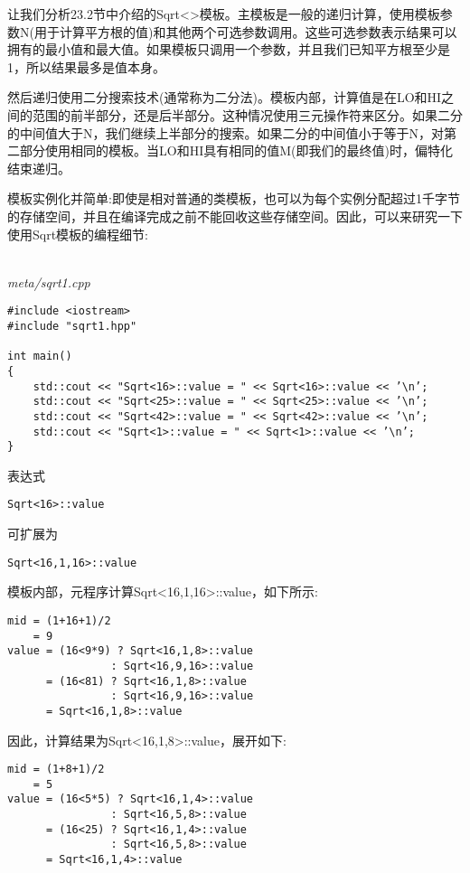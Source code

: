 
让我们分析23.2节中介绍的Sqrt<>模板。主模板是一般的递归计算，使用模板参数N(用于计算平方根的值)和其他两个可选参数调用。这些可选参数表示结果可以拥有的最小值和最大值。如果模板只调用一个参数，并且我们已知平方根至少是1，所以结果最多是值本身。

然后递归使用二分搜索技术(通常称为二分法)。模板内部，计算值是在LO和HI之间的范围的前半部分，还是后半部分。这种情况使用三元操作符来区分。如果二分的中间值大于N，我们继续上半部分的搜索。如果二分的中间值小于等于N，对第二部分使用相同的模板。当LO和HI具有相同的值M(即我们的最终值)时，偏特化结束递归。

模板实例化并简单:即使是相对普通的类模板，也可以为每个实例分配超过1千字节的存储空间，并且在编译完成之前不能回收这些存储空间。因此，可以来研究一下使用Sqrt模板的编程细节:

\hspace*{\fill} \\ %
\noindent
\textit{meta/sqrt1.cpp}
\begin{lstlisting}[style=styleCXX]
#include <iostream>
#include "sqrt1.hpp"

int main()
{
	std::cout << "Sqrt<16>::value = " << Sqrt<16>::value << ’\n’;
	std::cout << "Sqrt<25>::value = " << Sqrt<25>::value << ’\n’;
	std::cout << "Sqrt<42>::value = " << Sqrt<42>::value << ’\n’;
	std::cout << "Sqrt<1>::value = " << Sqrt<1>::value << ’\n’;
}
\end{lstlisting}

表达式

\begin{lstlisting}[style=styleCXX]
Sqrt<16>::value
\end{lstlisting}

可扩展为

\begin{lstlisting}[style=styleCXX]
Sqrt<16,1,16>::value
\end{lstlisting}

模板内部，元程序计算Sqrt<16,1,16>::value，如下所示:

\begin{lstlisting}[style=styleCXX]
mid = (1+16+1)/2
	= 9
value = (16<9*9) ? Sqrt<16,1,8>::value
				: Sqrt<16,9,16>::value
	  = (16<81) ? Sqrt<16,1,8>::value
				: Sqrt<16,9,16>::value
	  = Sqrt<16,1,8>::value
\end{lstlisting}

因此，计算结果为Sqrt<16,1,8>::value，展开如下:

\begin{lstlisting}[style=styleCXX]
mid = (1+8+1)/2
	= 5
value = (16<5*5) ? Sqrt<16,1,4>::value
				: Sqrt<16,5,8>::value
	  = (16<25) ? Sqrt<16,1,4>::value
				: Sqrt<16,5,8>::value
	  = Sqrt<16,1,4>::value
\end{lstlisting}

